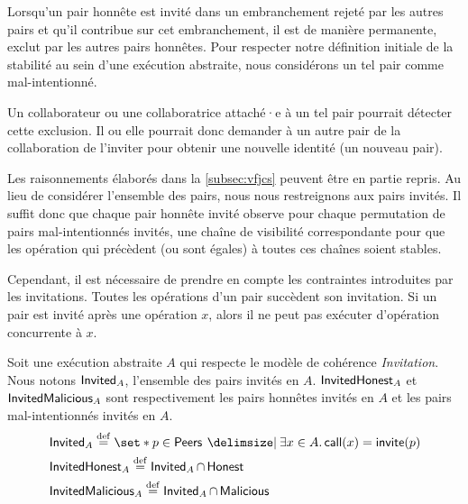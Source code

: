 Lorsqu'un pair honnête est invité dans un embranchement rejeté par les autres pairs et qu'il contribue sur cet embranchement, il est de manière permanente, exclut par les autres pairs honnêtes.
Pour respecter notre définition initiale de la stabilité au sein d'une exécution abstraite, nous considérons un tel pair comme mal-intentionné.

Un collaborateur ou une collaboratrice attaché·e à un tel pair pourrait détecter cette exclusion.
Il ou elle pourrait donc demander à un autre pair de la collaboration de l'inviter pour obtenir une nouvelle identité (un nouveau pair).

Les raisonnements élaborés dans la \autoref{subsec:vfjcs} peuvent être en partie repris.
Au lieu de considérer l'ensemble des pairs, nous nous restreignons aux pairs invités.
Il suffit donc que chaque pair honnête invité observe pour chaque permutation de pairs mal-intentionnés invités, une chaîne de visibilité correspondante pour que les opération qui précèdent (ou sont égales) à toutes ces chaînes soient stables.

Cependant, il est nécessaire de prendre en compte les contraintes introduites par les invitations.
Toutes les opérations d'un pair succèdent son invitation.
Si un pair est invité après une opération $x$, alors il ne peut pas exécuter d'opération concurrente à $x$.


\begin{definition}[Invités]\label{def:invited}
Soit une exécution abstraite $A$ qui respecte le modèle de cohérence \emph{Invitation}.
Nous notons $\operatorname{\mathsf{Invited}}_A$, l'ensemble des pairs invités en $A$.
$\operatorname{\mathsf{InvitedHonest}}_A$ et $\operatorname{\mathsf{InvitedMalicious}}_A$ sont respectivement les pairs honnêtes invités en $A$ et les pairs mal-intentionnés invités en $A$.
\begin{align*}
&\trm{Invited}_A \defeq \set*{p \in \trm{Peers} \given \exists x \in A \qsep \trm{call}(x) = \trm{invite}(p)}\\
&\trm{InvitedHonest}_A \defeq \trm{Invited}_A \cap \trm{Honest}\\
&\trm{InvitedMalicious}_A \defeq \trm{Invited}_A \cap \trm{Malicious}
\end{align*}
\end{definition}

